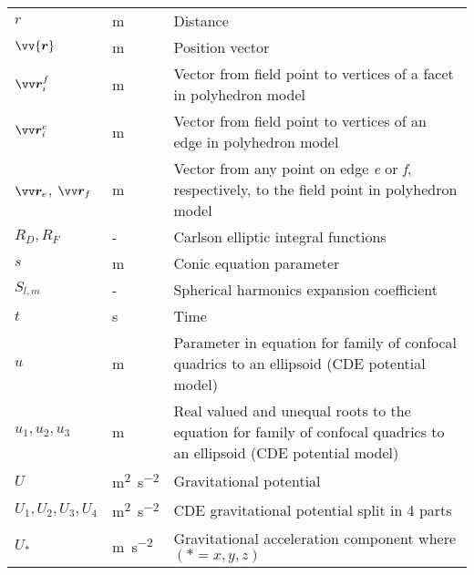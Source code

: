 \begin{longtable}[l]{p{100pt} p{70pt} p{250pt}}
    $r$              & m                & Distance                                          \\
    $\vv{\bm{r}}$    & m                & Position vector                                   \\
    $\bvector{r}_i^f$ & m               & Vector from field point to vertices of a facet
                                          in polyhedron model                               \\
    $\bvector{r}_i^e$ & m               & Vector from field point to vertices of an edge
                                          in polyhedron model                               \\
    $\bvector{r}_e$, $\bvector{r}_f$ & m & Vector from any point on edge \textit{e}
                                           or \textit{f}, respectively, to the field point
                                           in polyhedron model                              \\
    $R_D, R_F$       & -                & Carlson elliptic integral functions               \\
    $s$              & m                & Conic equation parameter                          \\
    $S_{l,m}$              & -                & Spherical harmonics expansion coefficient         \\
    $t$              & s                & Time                                              \\
    $u$              & m                & Parameter in equation for family of confocal
                                          quadrics to an ellipsoid (CDE potential model)    \\
    $u_1, u_2, u_3$  & m                & Real valued and unequal roots to the equation for
                                          family of confocal quadrics to an ellipsoid (CDE potential model)                                  \\
    $U$              & \si{\metre\squared\per\second\squared}        & Gravitational potential                           \\
    $U_1, U_2, U_3, U_4$ & \si{\metre\squared\per\second\squared}    & CDE gravitational potential split in 4 parts      \\
    $U_\ast$         & \si{\metre\per\second\squared}          & Gravitational acceleration component
                                          where $(\ast=x,y,z)$                              \\

\end{longtable}
